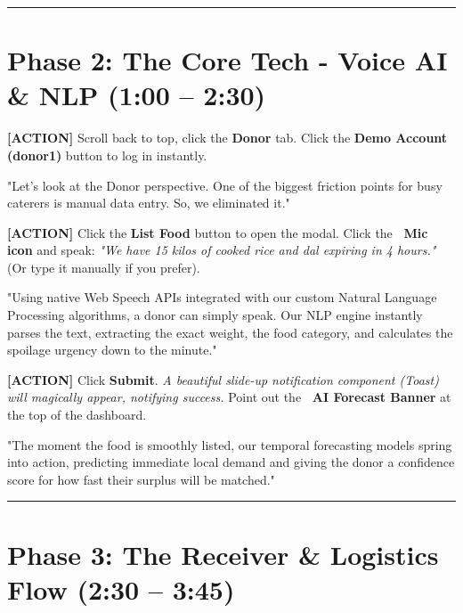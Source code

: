 \documentclass[12pt,a4paper]{article}
\begin{document}
\vspace{1em}
\hrule
\vspace{1em}

\section*{Phase 2: The Core Tech - Voice AI \& NLP (1:00 – 2:30)}

\noindent\textcolor{action}{\textbf{[ACTION]}} Scroll back to top, click the \textbf{Donor} tab. Click the \textbf{Demo Account (donor1)} button to log in instantly.

\begin{scriptbox}
"Let’s look at the Donor perspective. One of the biggest friction points for busy caterers is manual data entry. So, we eliminated it."
\end{scriptbox}

\noindent\textcolor{action}{\textbf{[ACTION]}} Click the \textbf{List Food} button to open the modal. Click the \textbf{\faMicrophone\ Mic icon} and speak: \textit{"We have 15 kilos of cooked rice and dal expiring in 4 hours."} (Or type it manually if you prefer).

\begin{scriptbox}
"Using native Web Speech APIs integrated with our custom Natural Language Processing algorithms, a donor can simply speak. Our NLP engine instantly parses the text, extracting the exact weight, the food category, and calculates the spoilage urgency down to the minute."
\end{scriptbox}

\noindent\textcolor{action}{\textbf{[ACTION]}} Click \textbf{Submit}. \textit{A beautiful slide-up notification component (Toast) will magically appear, notifying success.} Point out the \textbf{\faMagic\ AI Forecast Banner} at the top of the dashboard.

\begin{scriptbox}
"The moment the food is smoothly listed, our temporal forecasting models spring into action, predicting immediate local demand and giving the donor a confidence score for how fast their surplus will be matched."
\end{scriptbox}

\vspace{1em}
\hrule
\vspace{1em}

\section*{Phase 3: The Receiver \& Logistics Flow (2:30 – 3:45)}
\end{document}
